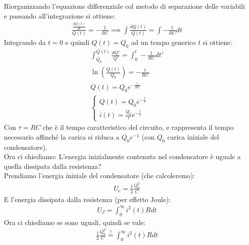 \documentclass[a4paper, oneside]{article}
\begin{document}
Riorganizzando l'equazione differenziale col metodo di separazione delle variabili e passando all'integrazione si ottiene:
\begin{gather*}
    \frac{\frac{dQ(t)}{dt}}{Q(t)} = -\frac{1}{RC} \implies
    \int \frac{dQ(t)}{Q(t)} = \int -\frac{1}{R C} dt
\end{gather*}
Integrando da $t=0$ e quindi $Q(t) = Q_0$ ad un tempo generico $t$ si ottiene:
\begin{gather*}
    \int_{Q_0}^{Q(t)} \frac{dQ'}{Q'} = \int_0^t -\frac{1}{R C} dt' \\
        \ln\left( \frac{Q(t)}{Q_0} \right) = -\frac{t}{R C} \\
         Q(t) = Q_0 e^{-\frac{t}{R C}}\\
    \begin{cases}
        Q(t) = Q_0 e^{-\frac{t}{\tau}}\\
        i(t) = \frac{Q_0}{\tau} e^{-\frac{t}{\tau}}
    \end{cases}
\end{gather*}
Con $\tau = R C$ che è il tempo caratteristico del circuito, e rappresenta il tempo necessario affinché la carica si riduca a $Q_0 e^{-1}$ (con $Q_0$ carica iniziale del condensatore).\\
Ora ci chiediamo: L'energia inizialmente contenuta nel condensatore è uguale a quella dissipata dalla resistenza?\\
Prendiamo l'energia iniziale del condensatore (che calcoleremo):
\begin{gather*}
    U_c = \frac{1}{2} \frac{Q_0^2}{C}
\end{gather*}
E l'energia dissipata dalla resistenza (per effetto Joule):
\begin{gather*}
    U_J = \int_0^\infty i^2(t) R dt
\end{gather*}
Ora ci chiediamo se sono uguali, quindi se vale:
\begin{gather*}
    \frac{1}{2} \frac{Q_0^2}{C} \overset{?}{=} \int^{\infty}_{0} i^2(t) R dt
\end{gather*}
\end{document}
